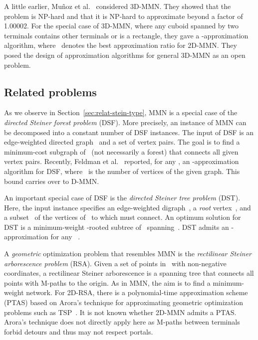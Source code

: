 \documentclass[11pt]{llncs}
\newcommand{\etal}{et al.}
\begin{document}
A little earlier, Mu{\~n}oz \etal~\cite{msu-mmnp3-09}
considered 3D-MMN.  They showed that the 
problem is NP-hard and that it is 
NP-hard to approximate beyond a
factor of 1.00002.  
For the special case of 3D-MMN, where any cuboid spanned by two
terminals contains other terminals or is a rectangle, they gave a
-approximation algorithm, where~ denotes the best approximation
ratio for 2D-MMN.  They posed the design of approximation algorithms
for general 3D-MMN as an open problem.

\subsection{Related problems}

As we observe in Section~\ref{sec:relat-stein-type}, MMN is a special
case of the \emph{directed Steiner forest problem} (DSF).  More
precisely, an instance of MMN can be decomposed into a constant number
of DSF instances.  The input of DSF is an edge-weighted directed
graph~ and a set of vertex pairs.  The goal is to find a
minimum-cost subgraph of~ (not necessarily a forest) that connects
all given vertex pairs.  Recently, Feldman \etal~\cite{fkn-iaadsf-09}
reported, for any , an -approximation
algorithm for DSF, where~ is the number of vertices of the given
graph.  This bound carries over to D-MMN.

An important special case of DSF is the \emph{directed Steiner
  \emph{tree} problem} (DST).  Here, the input instance specifies an
edge-weighted digraph~, a \emph{root} vertex~, and a subset~
of the vertices of~ to which  must connect.  An optimum solution
for DST is a minimum-weight -rooted subtree of~ spanning~.
DST admits an -approximation for any~
\cite{cccdggl-aadsp-98}.

A \emph{geometric} optimization problem that resembles MMN
is the \emph{rectilinear Steiner arborescence problem} (RSA).
Given a set of points in~ with non-negative coordinates, a
rectilinear Steiner arborescence is a spanning tree 
that connects all points with M-paths to the origin.  As in MMN, the
aim is to find a minimum-weight network.  For 2D-RSA, there is a 
polynomial-time approximation scheme (PTAS)
\cite{lr-ptasrsap-00} based on Arora's technique for approximating
geometric optimization problems such as TSP~\cite{a-asnph-03}.   
It is not known whether 2D-MMN admits a PTAS.  
Arora's technique 
does not directly apply here as M-paths between terminals
forbid detours and thus may not respect portals.  
\end{document}
